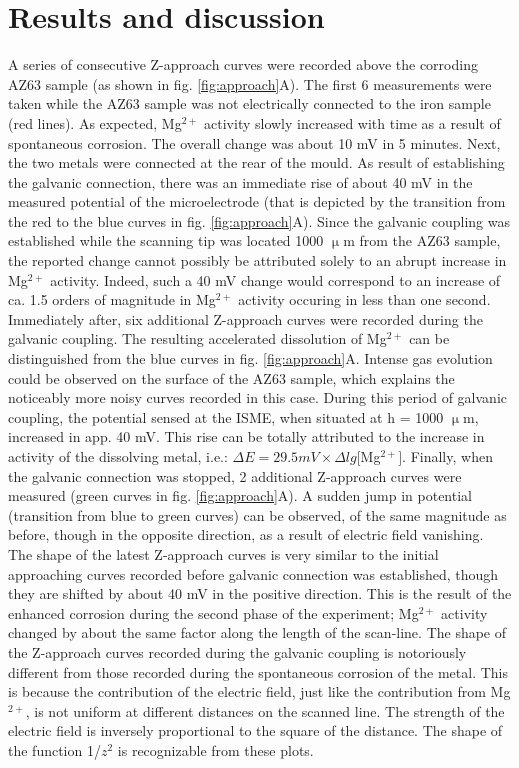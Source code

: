 \documentclass[3p]{elsarticle}
\begin{document}
\section{Results and discussion}

A series of consecutive Z-approach curves were recorded above the corroding AZ63 sample (as shown in fig. \ref{fig:approach}A). The first 6 measurements were taken while the AZ63 sample was not electrically connected to the iron sample (red lines). As expected, Mg$^{2+}$ activity slowly increased with time as a result of spontaneous corrosion. The overall change was about 10 mV in 5 minutes. Next, the two metals were connected at the rear of the mould. As result of establishing the galvanic connection, there was an immediate rise of about 40 mV in the measured potential of the microelectrode (that is depicted by the transition from the red to the blue curves in fig. \ref{fig:approach}A). Since the galvanic coupling was established while the scanning tip was located 1000 $\upmu$m from the AZ63 sample, the reported change cannot possibly be attributed solely to an abrupt increase in Mg$^{2+}$ activity. Indeed, such a 40 mV change would correspond to an increase of ca. 1.5 orders of magnitude in Mg$^{2+}$ activity occuring in less than one second. Immediately after, six additional Z-approach curves were recorded during the galvanic coupling. The resulting accelerated dissolution of Mg$^{2+}$ can be distinguished from the blue curves in fig. \ref{fig:approach}A. Intense gas evolution could be observed on the surface of the AZ63 sample, which explains the noticeably more noisy curves recorded in this case. During this period of galvanic coupling, the potential sensed at the ISME, when situated at h = 1000 $\upmu$m, increased in app. 40 mV. This rise can be totally attributed to the increase in activity of the dissolving metal, i.e.: $\Delta E = 29.5 mV \times \Delta lg[$Mg$^{2+}]$. Finally, when the galvanic connection was stopped, 2 additional Z-approach curves were measured (green curves in fig. \ref{fig:approach}A). A sudden jump in potential (transition from blue to green curves) can be observed, of the same magnitude as before, though in the opposite direction, as a result of electric field vanishing. The shape of the latest Z-approach curves is very similar to the initial approaching curves recorded before galvanic connection was established, though they are shifted by about 40 mV in the positive direction. This is the result of the enhanced corrosion during the second phase of the experiment; Mg$^{2+}$ activity changed by about the same factor along the length of the scan-line. The shape of the Z-approach curves recorded during the galvanic coupling is notoriously different from those recorded during the spontaneous corrosion of the metal. This is because the contribution of the electric field, just like the contribution from Mg$^{2+}$, is not uniform at different distances on the scanned line. The strength of the electric field is inversely proportional to the square of the distance. The shape of the function 1/$z^2$ is recognizable from these plots.
\end{document}
